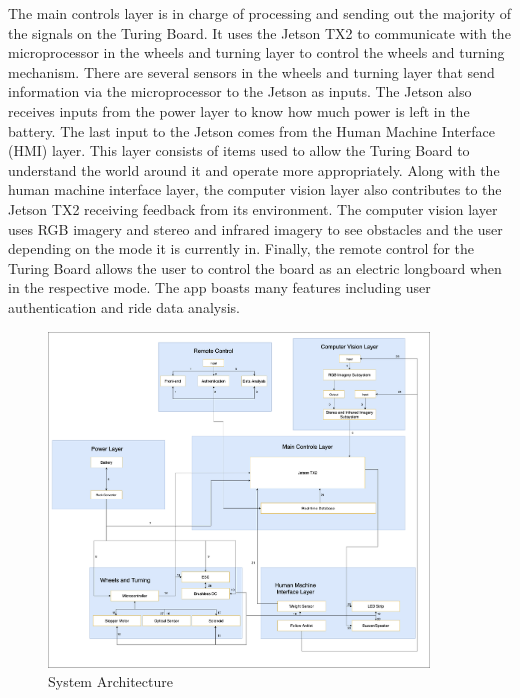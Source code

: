 The main controls layer is in charge of processing and sending out the majority of the signals on the Turing Board. It uses the Jetson TX2 to communicate with the microprocessor in the wheels and turning layer to control the wheels and turning mechanism. There are several sensors in the wheels and turning layer that send information via the microprocessor to the Jetson as inputs. The Jetson also receives inputs from the power layer to know how much power is left in the battery. The last input to the Jetson comes from the Human Machine Interface (HMI) layer. This layer consists of items used to allow the Turing Board to understand the world around it and operate more appropriately. Along with the human machine interface layer, the computer vision layer also contributes to the Jetson TX2 receiving feedback from its environment. The computer vision layer uses RGB imagery and stereo and infrared imagery to see obstacles and the user depending on the mode it is currently in. Finally, the remote control for the Turing Board allows the user to control the board as an electric longboard when in the respective mode. The app boasts many features including user authentication and ride data analysis.

\begin{figure}[h!]
	\centering
 	\includegraphics[width=0.90\textwidth]{images/data_flow} %
 \caption{System Architecture}
\end{figure}
